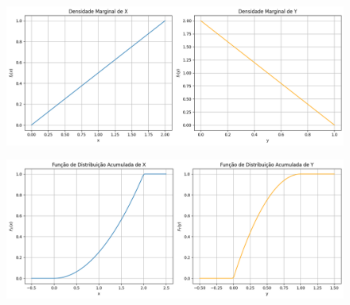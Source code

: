 	\begin{frame}
		
		\begin{figure}[!htb]
			\begin{center}
				\includegraphics[scale=0.3]{densidadesMarginaisXeY.png}
			\end{center}
		\end{figure} 
	
			\begin{figure}[!htb]
		\begin{center}
			\includegraphics[scale=0.3]{AcumuladasMarginaisXeY.png}
		\end{center}
	\end{figure} 
	\end{frame}
	


